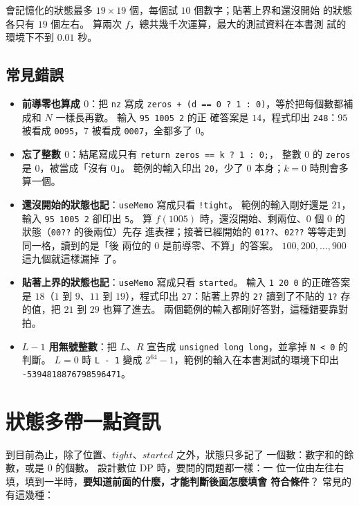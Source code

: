 會記憶化的狀態最多 $19 \times 19$ 個，每個試 $10$ 個數字；貼著上界和還沒開始
的狀態各只有 $19$ 個左右。 算兩次 $f$，總共幾千次運算，最大的測試資料在本書測
試的環境下不到 $0.01$ 秒。

\subsection{常見錯誤}

\begin{itemize}
\item \textbf{前導零也算成 $0$}：把 \texttt{nz} 寫成 \texttt{zeros + (d == 0 ?
1 : 0)}，等於把每個數都補成和 $N$ 一樣長再數。 輸入 \texttt{95 1005 2} 的正
確答案是 $14$，程式印出 \texttt{248}：$95$ 被看成 \texttt{0095}，$7$ 被看成
\texttt{0007}，全都多了 $0$。
\item \textbf{忘了整數 $0$}：結尾寫成只有 \texttt{return zeros == k ? 1 : 0;}，
整數 $0$ 的 \texttt{zeros} 是 $0$，被當成「沒有 $0$」。 範例的輸入印出
\texttt{20}，少了 $0$ 本身；$k = 0$ 時則會多算一個。
\item \textbf{還沒開始的狀態也記}：\texttt{useMemo} 寫成只看 \texttt{!tight}。
範例的輸入剛好還是 $21$，輸入 \texttt{95 1005 2} 卻印出 \texttt{5}。 算
$f(1005)$ 時，還沒開始、剩兩位、$0$ 個 $0$ 的狀態（\texttt{00??} 的後兩位）先存
進表裡；接著已經開始的 \texttt{01??}、\texttt{02??} 等等走到同一格，讀到的是「後
兩位的 $0$ 是前導零、不算」的答案。 $100, 200, \ldots, 900$ 這九個就這樣漏掉
了。
\item \textbf{貼著上界的狀態也記}：\texttt{useMemo} 寫成只看 \texttt{started}。
輸入 \texttt{1 20 0} 的正確答案是 $18$（$1$ 到 $9$、$11$ 到 $19$），程式印出
\texttt{27}：貼著上界的 \texttt{2?} 讀到了不貼的 \texttt{1?} 存的值，把 $21$
到 $29$ 也算了進去。 兩個範例的輸入都剛好答對，這種錯要靠對拍。
\item \textbf{$L - 1$ 用無號整數}：把 $L$、$R$ 宣告成 \texttt{unsigned long
long}，並拿掉 \texttt{N < 0} 的判斷。 $L = 0$ 時 \texttt{L - 1} 變成
$2^{64} - 1$，範例的輸入在本書測試的環境下印出 \texttt{-5394818876798596471}。
\end{itemize}

\section{狀態多帶一點資訊}
\label{sec:dg-extra}

到目前為止，除了位置、$\mathit{tight}$、$\mathit{started}$ 之外，狀態只多記了
一個數：數字和的餘數，或是 $0$ 的個數。 設計數位 DP 時，要問的問題都一樣：一
位一位由左往右填，填到一半時，\textbf{要知道前面的什麼，才能判斷後面怎麼填會
符合條件}？ 常見的有這幾種：

